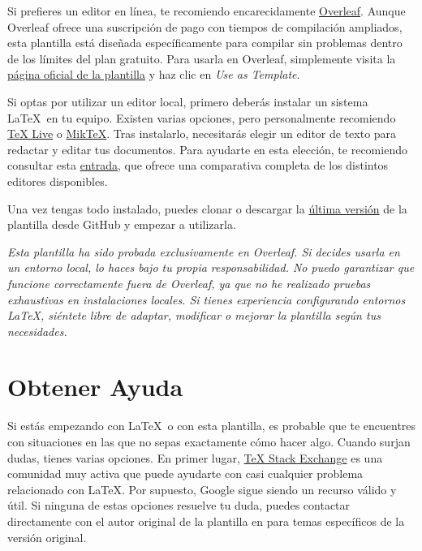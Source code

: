 Si prefieres un editor en línea, te recomiendo encarecidamente \href{https://www.overleaf.com/}{Overleaf}. Aunque Overleaf ofrece una suscripción de pago con tiempos de compilación ampliados, esta plantilla está diseñada específicamente para compilar sin problemas dentro de los límites del plan gratuito. Para usarla en Overleaf, simplemente visita la \href{https://www.overleaf.com/latex/templates/unofficial-polytechnic-university-of-leiria-estg-thesis-slash-report-template/tqgbrncfhwgt}{página oficial de la plantilla} y haz clic en \textit{Use as Template}.

Si optas por utilizar un editor local, primero deberás instalar un sistema \LaTeX~en tu equipo. Existen varias opciones, pero personalmente recomiendo \href{https://www.tug.org/texlive/}{TeX Live} o \href{https://miktex.org/}{MikTeX}. Tras instalarlo, necesitarás elegir un editor de texto para redactar y editar tus documentos. Para ayudarte en esta elección, te recomiendo consultar esta \href{https://tex.stackexchange.com/questions/339/latex-editors-ides}{entrada}, que ofrece una comparativa completa de los distintos editores disponibles.

Una vez tengas todo instalado, puedes clonar o descargar la \href{https://github.com/enriiquee/umu-thesis}{última versión} de la plantilla desde GitHub y empezar a utilizarla.

\begin{block}[warning]
\textit{Esta plantilla ha sido probada exclusivamente en Overleaf. Si decides usarla en un entorno local, lo haces bajo tu propia responsabilidad. No puedo garantizar que funcione correctamente fuera de Overleaf, ya que no he realizado pruebas exhaustivas en instalaciones locales. Si tienes experiencia configurando entornos \LaTeX, siéntete libre de adaptar, modificar o mejorar la plantilla según tus necesidades.}
\end{block}

\section{Obtener Ayuda}

Si estás empezando con \LaTeX~o con esta plantilla, es probable que te encuentres con situaciones en las que no sepas exactamente cómo hacer algo. Cuando surjan dudas, tienes varias opciones. En primer lugar, \href{https://tex.stackexchange.com/}{TeX Stack Exchange} es una comunidad muy activa que puede ayudarte con casi cualquier problema relacionado con \LaTeX. Por supuesto, Google sigue siendo un recurso válido y útil. Si ninguna de estas opciones resuelve tu duda, puedes contactar directamente con el autor original de la plantilla en \textit{\textcolor{blue}{}} para temas específicos de la versión original.

